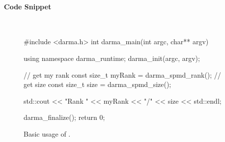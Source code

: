\paragraph{Code Snippet}\mbox{}\\ 
\begin{figure}[!h]
\begin{CppCodeNumb}
#include <darma.h>
int darma_main(int argc, char** argv)
{
  using namespace darma_runtime;
  darma_init(argc, argv);

  // get my rank
  const size_t myRank = darma_spmd_rank();
  // get size 
  const size_t size = darma_spmd_size();

  std::cout << "Rank " << myRank << "/" << size << std::endl;

  darma_finalize();
  return 0;
}
\end{CppCodeNumb}
\label{fig:fe_api_ranksize}
\caption{Basic usage of \protect{}.}
\end{figure}


